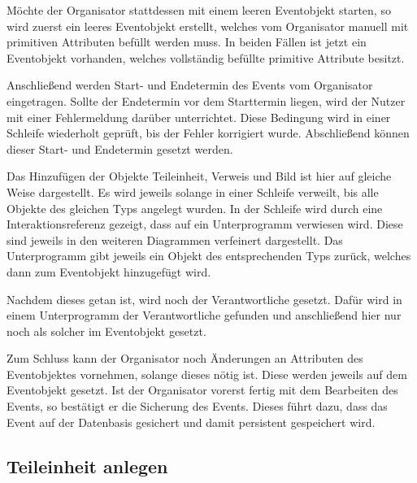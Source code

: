 Möchte der Organisator stattdessen mit einem leeren Eventobjekt starten, so wird zuerst ein leeres Eventobjekt erstellt, welches vom Organisator manuell mit primitiven Attributen befüllt werden muss. In beiden Fällen ist jetzt ein Eventobjekt vorhanden, welches vollständig befüllte primitive Attribute besitzt.

Anschließend werden Start- und Endetermin des Events vom Organisator eingetragen. Sollte der Endetermin vor dem Starttermin liegen, wird der Nutzer mit einer Fehlermeldung darüber unterrichtet. Diese Bedingung wird in einer Schleife wiederholt geprüft, bis der Fehler korrigiert wurde. Abschließend können dieser Start- und Endetermin gesetzt werden.

Das Hinzufügen der Objekte Teileinheit, Verweis und Bild ist hier auf gleiche Weise dargestellt. Es wird jeweils solange in einer Schleife verweilt, bis alle Objekte des gleichen Typs angelegt wurden. In der Schleife wird durch eine Interaktionsreferenz gezeigt, dass auf ein Unterprogramm verwiesen wird. Diese sind jeweils in den weiteren Diagrammen verfeinert dargestellt. Das Unterprogramm gibt jeweils ein Objekt des entsprechenden Typs zurück, welches dann zum Eventobjekt hinzugefügt wird.

Nachdem dieses getan ist, wird noch der Verantwortliche gesetzt. Dafür wird in einem Unterprogramm der Verantwortliche gefunden und anschließend hier nur noch als solcher im Eventobjekt gesetzt.

Zum Schluss kann der Organisator noch Änderungen an Attributen des Eventobjektes vornehmen, solange dieses nötig ist. Diese werden jeweils auf dem Eventobjekt gesetzt. Ist der Organisator vorerst fertig mit dem Bearbeiten des Events, so bestätigt er die Sicherung des Events. Dieses führt dazu, dass das Event auf der Datenbasis gesichert und damit persistent gespeichert wird.

\FloatBarrier

\subsection{Teileinheit anlegen}

